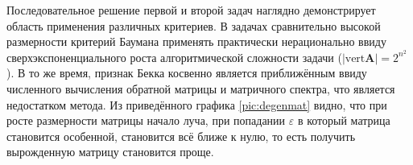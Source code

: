 Последовательное решение первой и второй задач наглядно демонстрирует область применения различных критериев. В задачах сравнительно высокой размерности критерий Баумана применять практически нерационально ввиду сверхэкспоненциального роста алгоритмической сложности задачи ($|\textrm{vert} \mathbf{A}| = 2 ^ {n ^ 2}$). В то же время, признак Бекка косвенно является приближённым ввиду численного вычисления обратной матрицы и матричного спектра, что является недостатком метода.
Из приведённого графика \ref{pic:degenmat} видно, что при росте размерности матрицы начало луча, при попадании $\varepsilon$ в который матрица становится особенной, становится всё ближе к нулю, то есть получить вырожденную матрицу становится проще.
